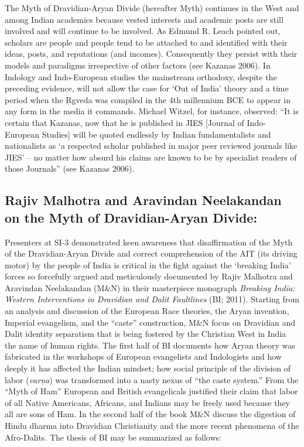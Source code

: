 The Myth of Dravidian-Aryan Divide (hereafter Myth) continues in the West and among Indian academics because vested interests and academic posts are still involved and will continue to be involved. As Edmund R. Leach pointed out, scholars are people and people tend to be attached to and identified with their ideas, posts, and reputations (and incomes). Consequently they persist with their models and paradigms irrespective of other factors (see Kazanas 2006). In Indology and Indo-European studies the mainstream orthodoxy, despite the preceding evidence, will not allow the case for ‘Out of India’ theory and a time period when the Ŗgveda was compiled in the 4th millennium BCE to appear in any form in the media it commands. Michael Witzel, for instance, observed: “It is certain that Kazanas, now that he is published in JIES [Journal of Indo-European Studies] will be quoted endlessly by Indian fundamentalists and nationalists as ‘a respected scholar published in major peer reviewed journals like JIES’ – no matter how absurd his claims are known to be by specialist readers of those Journals” (see Kazanas 2006).

\subsection*{Rajiv Malhotra and Aravindan Neelakandan on the Myth of Dravidian-Aryan Divide:}

Presenters at SI-3 demonstrated keen awareness that disaffirmation of the Myth of the Dravidian-Aryan Divide and correct comprehension of the AIT (its driving motor) by the people of India is critical in the fight against the ‘breaking India’ forces so forcefully argued and meticulously documented by Rajiv Malhotra and Aravindan Neelakandan (M\&N) in their masterpiece monograph \textit{Breaking India: Western Interventions in Dravidian and Dalit Faultlines} (BI; 2011). Starting from an analysis and discussion of the European Race theories, the Aryan invention, Imperial evangelism, and the “caste” construction, M\&N focus on Dravidian and Dalit identity separatism that is being fostered by the Christian West in India the name of human rights. The first half of BI documents how Aryan theory was fabricated in the workshops of European evangelists and Indologists and how deeply it has affected the Indian mindset; how social principle of the division of labor (\textit{varņa}) was transformed into a nasty nexus of “the caste system.” From the “Myth of Ham” European and British evangelicals justified their claim that labor of all Native Americans, Africans, and Indians may be freely used because they all are sons of Ham. In the second half of the book M\&N discuss the digestion of Hindu dharma into Dravidian Christianity and the more recent phenomena of the Afro-Dalits. The thesis of BI may be summarized as follows:

